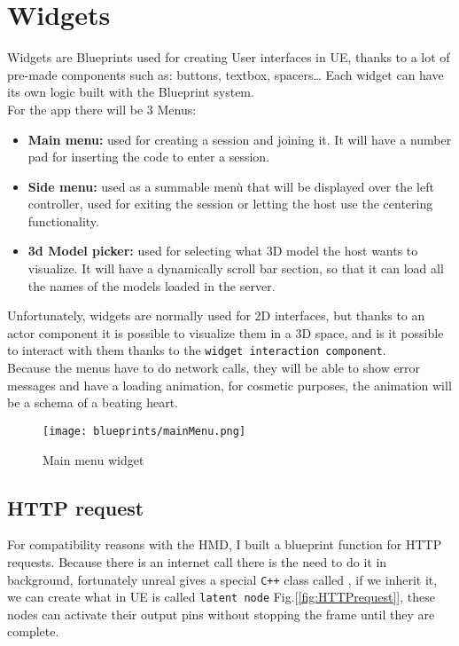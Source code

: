\section{Widgets}
\label{sec:widgets}
\noindent
Widgets are Blueprints used for creating User interfaces in \ac{UE}, thanks to a lot of pre-made components such as: buttons, textbox, spacers… Each widget can have its own logic built with the Blueprint system.\\
For the app there will be 3 Menus:
\begin{itemize}
    \item \textbf{Main menu:} used for creating a session and joining it. It will have a number pad for inserting the code to enter a session.
    \item \textbf{Side menu:} used as a summable menù that will be displayed over the left controller, used for exiting the session or letting the host use the centering functionality.
    \item \textbf{3d Model picker:} used for selecting what 3D model the host wants to visualize. It will have a dynamically scroll bar section, so that it can load all the names of the models loaded in the server. 
\end{itemize}
\noindent
Unfortunately, widgets are normally used for 2D interfaces, but thanks to an actor component it is possible to visualize them in a 3D space, and is it possible to interact with them thanks to the \texttt{widget interaction component}.\\
Because the menus have to do network calls, they will be able to show error messages and have a loading animation, for cosmetic purposes, the animation will be a schema of a beating heart.


\begin{figure}[ht]
    \centering
    \texttt{[image: blueprints/mainMenu.png]}
    \caption{Main menu widget}
    \label{fig:mainMenu}
\end{figure}

\subsection{HTTP request}
\noindent
For compatibility reasons with the \ac{HMD}, I built a blueprint function for \ac{HTTP} requests.
Because there is an internet call there is the need to do it in background, fortunately unreal gives a special \texttt{C++} class called ,
if we inherit it, we can create what in \ac{UE} is called \texttt{latent node} Fig.[\ref{fig:HTTPrequest}], these nodes can activate their output pins without stopping the frame until they are complete. 

